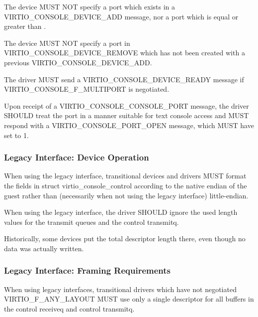 The device MUST NOT specify a port which exists in a
VIRTIO_CONSOLE_DEVICE_ADD message, nor a port which is equal or
greater than .

The device MUST NOT specify a port in VIRTIO_CONSOLE_DEVICE_REMOVE
which has not been created with a previous VIRTIO_CONSOLE_DEVICE_ADD.


The driver MUST send a VIRTIO_CONSOLE_DEVICE_READY message if
VIRTIO_CONSOLE_F_MULTIPORT is negotiated.

Upon receipt of a VIRTIO_CONSOLE_CONSOLE_PORT message, the driver
SHOULD treat the port in a manner suitable for text console access
and MUST respond with a VIRTIO_CONSOLE_PORT_OPEN message, which MUST
have  set to 1.

\subsubsection{Legacy Interface: Device Operation}\label{sec:Device Types / Console Device / Device Operation / Legacy Interface: Device Operation}
When using the legacy interface, transitional devices and drivers
MUST format the fields in struct virtio_console_control
according to the native endian of the guest rather than
(necessarily when not using the legacy interface) little-endian.

When using the legacy interface, the driver SHOULD ignore the
used length values for the transmit queues
and the control transmitq.
\begin{note}
Historically, some devices put the total descriptor length there,
even though no data was actually written.
\end{note}

\subsubsection{Legacy Interface: Framing Requirements}\label{sec:Device
Types / Console Device / Legacy Interface: Framing Requirements}

When using legacy interfaces, transitional drivers which have not
negotiated VIRTIO_F_ANY_LAYOUT MUST use only a single
descriptor for all buffers in the control receiveq and control transmitq.


